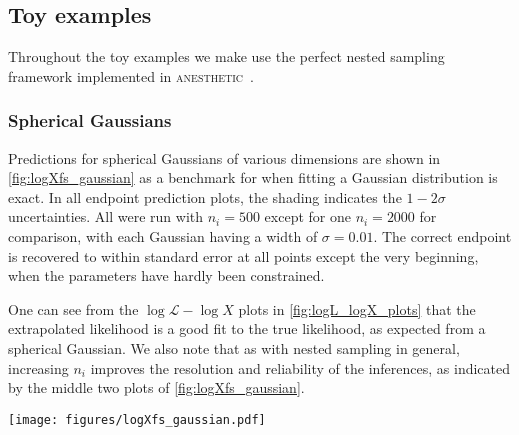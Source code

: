 \documentclass[usenatbib]{mnras}
\newcommand{\nlive}{n_i}
\newcommand{\Like}{\mathcal{L}}
\begin{document}
\subsection{Toy examples}\label{sec:logXfs_toy}
Throughout the toy examples we make use the perfect nested sampling~\citep{Keeton_2011,2018BayAn..13..873H} framework implemented in \textsc{anesthetic}~\citep{anesthetic}.
\subsubsection{Spherical Gaussians}
Predictions for spherical Gaussians of various dimensions are shown in \cref{fig:logXfs_gaussian} as a benchmark for when fitting a Gaussian distribution is exact. In all endpoint prediction plots, the shading indicates the $1-2\sigma$ uncertainties. All were run with $\nlive = 500$ except for one $\nlive=2000$ for comparison, with each Gaussian having a width of $\sigma = 0.01$. The correct endpoint is recovered to within standard error at all points except the very beginning, when the parameters have hardly been constrained. 
\par
One can see from the $\log\Like-\log X$ plots in \cref{fig:logL_logX_plots} that the extrapolated likelihood is a good fit to the true likelihood, as expected from a spherical Gaussian. We also note that as with nested sampling in general, increasing $\nlive$ improves the resolution and reliability of the inferences, as indicated by the middle two plots of \cref{fig:logXfs_gaussian}.
\begin{figure*}
\begin{center}
    \texttt{[image: figures/logXfs\_gaussian.pdf]}
\end{center}
\caption{Endpoint predictions for a spherical Gaussian run with $\nlive=500$ (except for the third plot from left). The true endpoints are shown in dotted red, while the estimates with their $1-2\sigma$ uncertainties are shaded in blue. Progress is measured in terms of the compression $-\log X$ along the x-axis, while the estimates on the y-axis are in terms of the predicted final compression $-\log \hat{X}_\mathrm{f}$. The correct endpoint is obtained for all but the earliest iterations, and the uncertainty is controlled by the number of live points, which can be seen from the two $d = 16$ plots.}
\label{fig:logXfs_gaussian}
\end{figure*}
\end{document}
